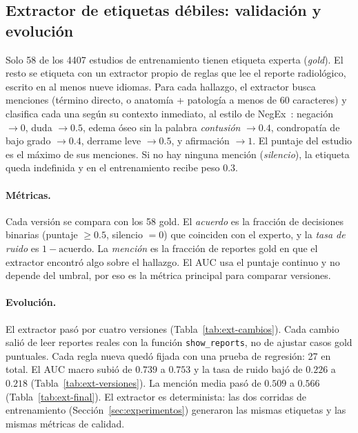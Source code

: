 
\subsection{Extractor de etiquetas débiles: validación y evolución}
\label{sec:extractor}

Solo 58 de los 4407 estudios de entrenamiento tienen etiqueta experta (\emph{gold}).
El resto se etiqueta con un extractor propio de reglas que lee el reporte radiológico, escrito en al menos nueve idiomas.
Para cada hallazgo, el extractor busca menciones (término directo, o anatomía + patología a menos de 60 caracteres) y clasifica cada una según su contexto inmediato, al estilo de NegEx~\cite{chapman2001negex}:
negación $\rightarrow 0$, duda $\rightarrow 0.5$, edema óseo sin la palabra \emph{contusión} $\rightarrow 0.4$, condropatía de bajo grado $\rightarrow 0.4$, derrame leve $\rightarrow 0.5$, y afirmación $\rightarrow 1$.
El puntaje del estudio es el máximo de sus menciones.
Si no hay ninguna mención (\emph{silencio}), la etiqueta queda indefinida y en el entrenamiento recibe peso $0.3$.

\paragraph{Métricas.}
Cada versión se compara con los 58 gold.
El \emph{acuerdo} es la fracción de decisiones binarias (puntaje $\geq 0.5$, silencio $=0$) que coinciden con el experto, y la \emph{tasa de ruido} es $1-\text{acuerdo}$.
La \emph{mención} es la fracción de reportes gold en que el extractor encontró algo sobre el hallazgo.
El AUC usa el puntaje continuo y no depende del umbral, por eso es la métrica principal para comparar versiones.

\paragraph{Evolución.}
El extractor pasó por cuatro versiones (Tabla~\ref{tab:ext-cambios}).
Cada cambio salió de leer reportes reales con la función \texttt{show\_reports}, no de ajustar casos gold puntuales.
Cada regla nueva quedó fijada con una prueba de regresión: 27 en total.
El AUC macro subió de $0.739$ a $0.753$ y la tasa de ruido bajó de $0.226$ a $0.218$ (Tabla~\ref{tab:ext-versiones}).
La mención media pasó de $0.509$ a $0.566$ (Tabla~\ref{tab:ext-final}).
El extractor es determinista: las dos corridas de entrenamiento (Sección~\ref{sec:experimentos}) generaron las mismas etiquetas y las mismas métricas de calidad.

